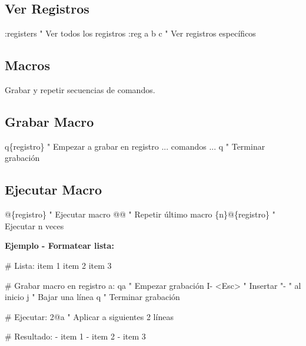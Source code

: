 \documentclass[
  doc,
  floatsintext,
  longtable,
  a4paper,
  nolmodern,
  notxfonts,
  notimes,
  12pt,
  colorlinks=true,linkcolor=blue,citecolor=blue,urlcolor=blue]{apa7}
\newenvironment{Shaded}{\begin{snugshade}}{\end{snugshade}}
\newcommand{\NormalTok}[1]{\textcolor[rgb]{0.00,0.23,0.31}{#1}}
\begin{document}
\subsection{Ver Registros}\label{ver-registros}

\begin{Shaded}
\begin{Highlighting}[]
\NormalTok{:registers      " Ver todos los registros}
\NormalTok{:reg a b c      " Ver registros específicos}
\end{Highlighting}
\end{Shaded}

\subsection{Macros}\label{macros}

Grabar y repetir secuencias de comandos.

\subsection{Grabar Macro}\label{grabar-macro}

\begin{Shaded}
\begin{Highlighting}[]
\NormalTok{q\{registro\}     " Empezar a grabar en registro}
\NormalTok{... comandos ...}
\NormalTok{q               " Terminar grabación}
\end{Highlighting}
\end{Shaded}

\subsection{Ejecutar Macro}\label{ejecutar-macro}

\begin{Shaded}
\begin{Highlighting}[]
\NormalTok{@\{registro\}     " Ejecutar macro}
\NormalTok{@@              " Repetir último macro}
\NormalTok{\{n\}@\{registro\}  " Ejecutar n veces}
\end{Highlighting}
\end{Shaded}

\textbf{Ejemplo - Formatear lista:}

\begin{Shaded}
\begin{Highlighting}[]
\NormalTok{\# Lista:}
\NormalTok{item 1}
\NormalTok{item 2}
\NormalTok{item 3}

\NormalTok{\# Grabar macro en registro a:}
\NormalTok{qa              " Empezar grabación}
\NormalTok{I{-} \textless{}Esc\textgreater{}        " Insertar "{-} " al inicio}
\NormalTok{j               " Bajar una línea}
\NormalTok{q               " Terminar grabación}

\NormalTok{\# Ejecutar:}
\NormalTok{2@a             " Aplicar a siguientes 2 líneas}

\NormalTok{\# Resultado:}
\NormalTok{{-} item 1}
\NormalTok{{-} item 2}
\NormalTok{{-} item 3}
\end{Highlighting}
\end{Shaded}
\end{document}
